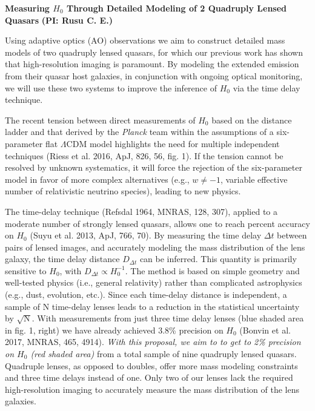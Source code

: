 \documentclass[a4paper,11pt]{article}
\begin{document}
\begin {centering}
{\bf Measuring $H_0$ Through Detailed Modeling of 2 Quadruply Lensed Quasars} {\bf (PI: Rusu C. E.)}\\
 \end{centering}
 
\medskip

 Using adaptive optics (AO) observations we aim to construct detailed mass models of two quadruply lensed quasars, for which our previous work has shown that high-resolution imaging is paramount. By modeling the extended emission from their quasar host galaxies, in conjunction with ongoing optical monitoring, we will use these two systems to improve the inference of $H_0$ via the time delay technique.

The recent tension between direct measurements of $H_{0}$ based on the distance ladder and that derived by the {\it Planck} team within the assumptions of a six-parameter flat $\Lambda$CDM model highlights the need for multiple independent techniques (Riess et al. 2016, ApJ, 826, 56, fig. 1). If the tension cannot be resolved by unknown systematics, it will force the rejection of the six-parameter model in favor of more complex alternatives (e.g., $w \ne -1$, variable effective number of relativistic neutrino species), leading to new physics. 

The time-delay technique (Refsdal 1964, MNRAS, 128, 307), applied to a moderate number of strongly lensed quasars, allows one to reach percent accuracy on $H_{0}$ (Suyu et al. 2013, ApJ, 766, 70). By measuring the time delay $\Delta t$ between pairs of lensed images, and accurately modeling the mass distribution of the lens galaxy, the time delay distance $D_{\Delta t}$ can be inferred. This quantity is primarily sensitive to $H_{0}$, with $D_{\Delta t} \propto H_{0}^{-1}$. The method is based on simple geometry and well-tested physics (i.e., general relativity) rather than complicated astrophysics (e.g., dust, evolution, etc.). Since each time-delay distance is independent, a sample of N time-delay lenses leads to a reduction in the statistical uncertainty by $\sqrt{\mathrm{N}}$. With measurements from just three time delay lenses (blue shaded area in fig. 1, right) we have already achieved 3.8\% precision on $H_{0}$ (Bonvin et al. 2017, MNRAS, 465, 4914). {\it With this proposal, we aim to to get to 2\% precision on $H_{0}$ (red shaded area)} from a total sample of nine quadruply lensed quasars. Quadruple lenses, as opposed to doubles, offer more mass modeling constraints and three time delays instead of one. Only two of our lenses lack the required high-resolution imaging to accurately measure the mass distribution of the lens galaxies.
\end{document}
